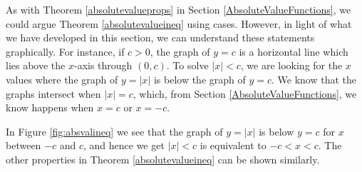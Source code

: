 \smallskip


\medskip

As with Theorem \ref{absolutevalueprops} in Section \ref{AbsoluteValueFunctions}, we could argue Theorem \ref{absolutevalueineq} using cases.  However, in light of what we have developed in this section, we can understand these statements graphically.  For instance, if $c > 0$, the graph of $y=c$ is a horizontal line which lies above the $x$-axis through $(0,c)$.  To solve $|x| < c$, we are looking for the $x$ values where the graph of $y=|x|$ is below the graph of $y=c$.  We know that the graphs intersect when $|x|=c$, which, from Section \ref{AbsoluteValueFunctions}, we know happens when $x=c$ or $x=-c$.  


In Figure \ref{fig:absvalineq} we see that the graph of $y=|x|$ is below $y=c$ for $x$ between $-c$ and $c$, and hence we get $|x| < c$ is equivalent to $-c < x < c$.  The other properties in Theorem \ref{absolutevalueineq} can be shown similarly.

\medskip

